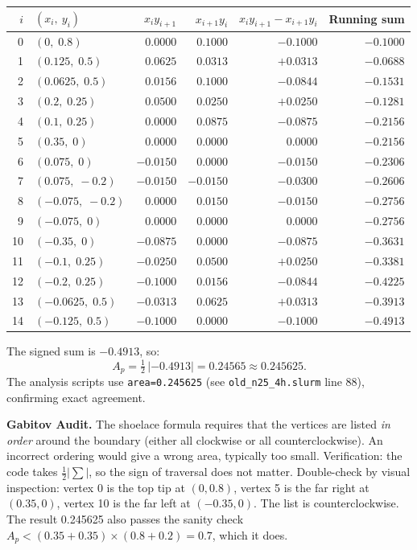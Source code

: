 \documentclass[11pt,oneside]{article}
\newcommand{\gabitov}[1]{\begin{gabitovbox}\textbf{Gabitov Audit.} #1\end{gabitovbox}}
\begin{document}
\begin{center}
\small
\setlength{\tabcolsep}{6pt}
\begin{tabular}{rlrrrr}
\toprule
$i$ & $(x_i,\ y_i)$ & $x_i y_{i+1}$ & $x_{i+1} y_i$ &
$x_i y_{i+1} - x_{i+1} y_i$ & Running sum \\
\midrule
 0 & $(0,\;0.8)$        & $0.0000$  & $0.1000$ & $-0.1000$ & $-0.1000$ \\
 1 & $(0.125,\;0.5)$    & $0.0625$  & $0.0313$ & $+0.0313$ & $-0.0688$ \\
 2 & $(0.0625,\;0.5)$   & $0.0156$  & $0.1000$ & $-0.0844$ & $-0.1531$ \\
 3 & $(0.2,\;0.25)$     & $0.0500$  & $0.0250$ & $+0.0250$ & $-0.1281$ \\
 4 & $(0.1,\;0.25)$     & $0.0000$  & $0.0875$ & $-0.0875$ & $-0.2156$ \\
 5 & $(0.35,\;0)$       & $0.0000$  & $0.0000$ & $0.0000$  & $-0.2156$ \\
 6 & $(0.075,\;0)$      & $-0.0150$ & $0.0000$ & $-0.0150$ & $-0.2306$ \\
 7 & $(0.075,\;{-}0.2)$ & $-0.0150$ & $-0.0150$& $-0.0300$ & $-0.2606$ \\
 8 & $({-}0.075,\;{-}0.2)$&$0.0000$ & $0.0150$ & $-0.0150$ & $-0.2756$ \\
 9 & $({-}0.075,\;0)$   & $0.0000$  & $0.0000$ & $0.0000$  & $-0.2756$ \\
10 & $({-}0.35,\;0)$    & $-0.0875$ & $0.0000$ & $-0.0875$ & $-0.3631$ \\
11 & $({-}0.1,\;0.25)$  & $-0.0250$ & $0.0500$ & $+0.0250$ & $-0.3381$ \\
12 & $({-}0.2,\;0.25)$  & $-0.1000$ & $0.0156$ & $-0.0844$ & $-0.4225$ \\
13 & $({-}0.0625,\;0.5)$& $-0.0313$ & $0.0625$ & $+0.0313$ & $-0.3913$ \\
14 & $({-}0.125,\;0.5)$ & $-0.1000$ & $0.0000$ & $-0.1000$ & $-0.4913$ \\
\bottomrule
\end{tabular}
\end{center}

The signed sum is $-0.4913$, so:
\begin{equation}
  A_p = \tfrac{1}{2}\,|{-0.4913}| = 0.24565 \approx 0.245625.
  \label{eq:area}
\end{equation}
The analysis scripts use \texttt{area=0.245625} (see
\texttt{old\_n25\_4h.slurm} line 88), confirming exact agreement.

\gabitov{%
The shoelace formula requires that the vertices are listed
\emph{in order} around the boundary (either all clockwise or all
counterclockwise). An incorrect ordering would give a wrong area,
typically too small. Verification: the code takes $\tfrac{1}{2}
|\sum|$, so the sign of traversal does not matter. Double-check
by visual inspection: vertex 0 is the top tip at $(0, 0.8)$, vertex 5
is the far right at $(0.35, 0)$, vertex 10 is the far left at
$(-0.35, 0)$. The list is counterclockwise. The result 0.245625
also passes the sanity check $A_p < (0.35 + 0.35) \times (0.8 + 0.2)
= 0.7$, which it does.%
}
\end{document}
